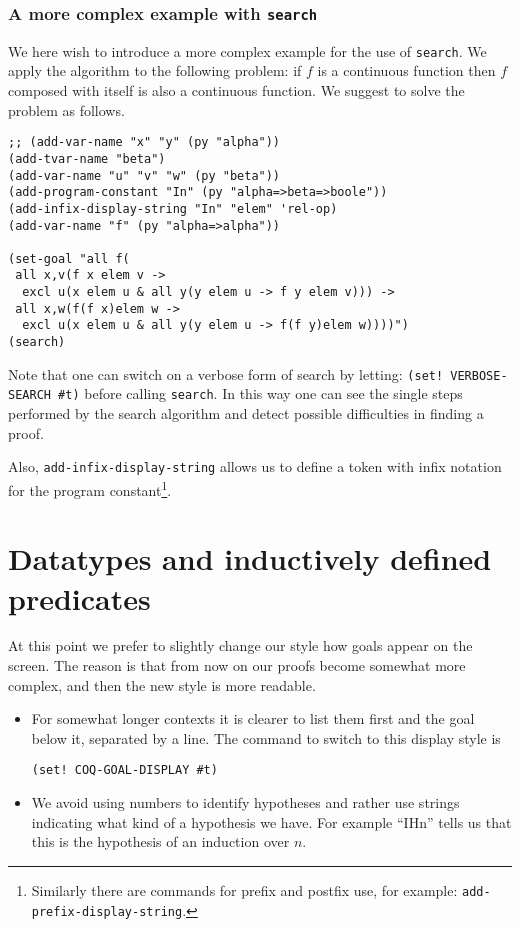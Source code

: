 \documentclass[12pt]{amsart}
\newcommand{\inquotes}[1]{``#1''}
\begin{document}
\subsubsection{A more complex example with \texttt{search}}
We here wish to introduce a more complex example for the use of
\texttt{search}.  We apply the algorithm to the following problem: if
$f$ is a continuous function then $f$ composed with itself is also a
continuous function.  We suggest to solve the problem as follows.
\begin{verbatim}
;; (add-var-name "x" "y" (py "alpha"))
(add-tvar-name "beta")
(add-var-name "u" "v" "w" (py "beta"))
(add-program-constant "In" (py "alpha=>beta=>boole"))
(add-infix-display-string "In" "elem" 'rel-op)
(add-var-name "f" (py "alpha=>alpha"))

(set-goal "all f(
 all x,v(f x elem v -> 
  excl u(x elem u & all y(y elem u -> f y elem v))) ->
 all x,w(f(f x)elem w -> 
  excl u(x elem u & all y(y elem u -> f(f y)elem w))))")
(search)
\end{verbatim}
Note that one can switch on a verbose form of search by letting:
\texttt{(set! VERBOSE-SEARCH \#t)} before calling \texttt{search}. In
this way one can see the single steps performed by the search
algorithm and detect possible difficulties in finding a proof.

Also, \texttt{add-infix-display-string} allows us to define a token
with infix notation for the program constant\footnote{Similarly there
  are commands for prefix and postfix use, for example:
  \texttt{add-prefix-display-string}.}.

\section{Datatypes and inductively defined predicates}
\label{Datatypes}
At this point we prefer to slightly change our style how goals appear
on the screen.  The reason is that from now on our proofs become
somewhat more complex, and then the new style is more readable.
\begin{itemize}
\item For somewhat longer contexts it is clearer to list them first
  and the goal below it, separated by a line.  The command to switch
  to this display style is
\begin{verbatim}
(set! COQ-GOAL-DISPLAY #t)
\end{verbatim}
\item We avoid using numbers to identify hypotheses and rather use
  strings indicating what kind of a hypothesis we have.  For example
  \inquotes{IHn} tells us that this is the hypothesis of an induction
  over $n$.
\end{itemize}
\end{document}
